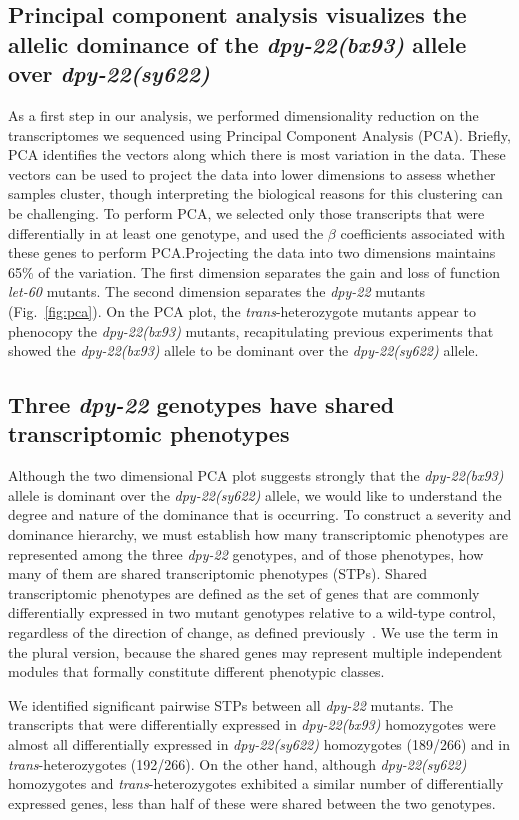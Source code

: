 \documentclass[9pt,twocolumn,twoside]{gsajnl}
\newcommand{\gene}[1]{\mbox{\emph{#1}}}
\newcommand{\dpy}[1]{\gene{dpy-22#1}}
\newcommand{\weakn}{266}
\newcommand{\bx}{\dpy{(bx93)}}
\newcommand{\sy}{\dpy{(sy622)}}
\begin{document}
\subsection*{Principal component analysis visualizes the allelic dominance of
             the \bx{} allele over \sy{}}
As a first step in our analysis, we performed dimensionality reduction on the
transcriptomes we sequenced using Principal Component Analysis (PCA). Briefly,
PCA identifies the vectors along which there is most variation in the data.
These vectors can be used to project the data into lower dimensions to assess
whether samples cluster, though interpreting the biological reasons for this
clustering can be challenging. To perform PCA, we selected only those
transcripts that were differentially in at least one genotype, and used the
$\beta$ coefficients associated with these genes to perform PCA.\@ Projecting
the data into two dimensions maintains 65\% of the variation. The first
dimension separates the gain and loss of function \gene{let-60} mutants. The
second dimension separates the \dpy{} mutants (Fig.~\ref{fig:pca}). On the
PCA plot, the \emph{trans}-heterozygote mutants appear to phenocopy the \bx{}
mutants, recapitulating previous experiments that showed the \bx{} allele to be
dominant over the \sy{} allele.

\subsection*{Three \dpy{} genotypes have shared transcriptomic
             phenotypes}
Although the two dimensional PCA plot suggests strongly that the \bx{} allele is
dominant over the \sy{} allele, we would like to understand the degree and
nature of the dominance that is occurring. To construct a severity and dominance
hierarchy, we must establish how many transcriptomic phenotypes are
represented among the three \dpy{} genotypes, and of those phenotypes, how many
of them are shared transcriptomic phenotypes (STPs). Shared transcriptomic
phenotypes are defined as the set of genes that are commonly differentially
expressed in two mutant genotypes relative to a wild-type control, regardless
of the direction of change, as defined previously~\citep{AngelesAlboresHIF}. We
use the term in the plural version, because the shared genes may represent
multiple independent modules that formally constitute different phenotypic
classes.

We identified significant pairwise STPs between all \dpy{} mutants. The
transcripts that were differentially expressed in \bx{} homozygotes were almost
all differentially expressed in \sy{} homozygotes (189/\weakn{}) and in
\emph{trans}-heterozygotes (192/\weakn{}). On the other hand, although \sy{}
homozygotes and \emph{trans}-heterozygotes exhibited a similar number of
differentially expressed genes, less than half of these were shared between the
two genotypes.
\end{document}
